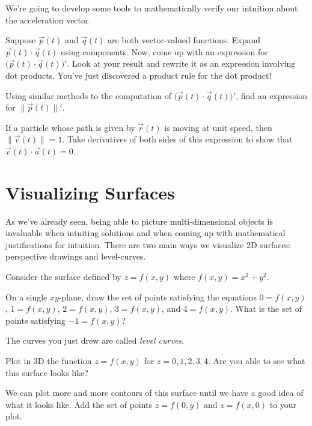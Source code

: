 \documentclass{problemset}
\begin{document}
	We're going to develop some tools to mathematically verify our intuition about the acceleration
	vector.

	\question
	\begin{parts}
		\item Suppose $\vec p(t)$ and $\vec q(t)$ are both vector-valued functions.  Expand $\vec p(t)\cdot\vec q(t)$
		using components. Now, come up with an expression for $\Big(\vec p(t)\cdot\vec q(t)\Big)'$.  Look at your
		result and rewrite it as an expression involving dot products.
		You've just discovered a product rule for the dot product!
		\item Using similar methods to the computation of $\Big(\vec p(t)\cdot\vec q(t)\Big)'$, find an expression
			for $\|\vec p(t)\|'$.
		\item If a particle whose path is given by $\vec r(t)$ is moving at unit speed, then $\|\vec v(t)\| = 1$.
			Take derivatives of both sides of this expression to show that $\vec v(t)\cdot \vec a(t) = 0$.
	\end{parts}



\section*{Visualizing Surfaces}
	As we've already seen, being able to picture multi-dimensional objects is 
	invaluable when intuiting solutions and when coming up with mathematical
	justifications for intuition.  There are two main ways we visualize
	2D surfaces: perspective drawings and level-curves.


	\question
		Consider the surface defined by $z=f(x,y)$ where $f(x,y)=x^2+y^2$.
	\begin{parts}
		\item On a single $xy$-plane, draw the set of points satisfying the equations $0=f(x,y)$, $1=f(x,y)$,
			$2=f(x,y)$, $3=f(x,y)$, and $4=f(x,y)$.  What is the set of points satisfying $-1=f(x,y)$?
	\end{parts}
	The curves you just drew are called \emph{level curves}.
	\begin{parts}[resume]
		\item Plot in 3D the function $z=f(x,y)$ for $z=0,1,2,3,4$.  Are you able to see what this surface looks like?
		\item We can plot more and more contours of this surface until we have a good idea of what it looks like.
			Add the set of points $z=f(0,y)$ and $z=f(x,0)$ to your plot.
	\end{parts}
\end{document}
